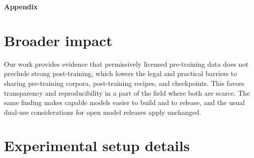 \documentclass{article}
\begin{document}




\newpage



\clearpage
\begin{appendix}

\begin{center}
{\Large\bf Appendix}
\end{center}

\section*{Broader impact}
Our work provides evidence that permissively licensed pre-training data does not preclude strong post-training, which lowers the legal and practical barriers to sharing pre-training corpora, post-training recipes, and checkpoints. This favors transparency and reproducibility in a part of the field where both are scarce. The same finding makes capable models easier to build and to release, and the usual dual-use considerations for open model releases apply unchanged.





\section{Experimental setup details}
\label{appendix:exp_details}









\end{appendix}
\end{document}
